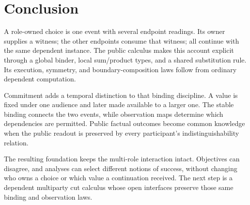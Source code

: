 \section{Conclusion}

A role-owned choice is one event with several endpoint readings. Its owner
supplies a witness; the other endpoints consume that witness; all continue
with the same dependent instance. The public calculus makes this account
explicit through a global binder, local sum/product types, and a shared
substitution rule. Its execution, symmetry, and boundary-composition laws
follow from ordinary dependent computation.

Commitment adds a temporal distinction to that binding discipline. A value is
fixed under one audience and later made available to a larger one. The stable
binding connects the two events, while observation maps determine which
dependencies are permitted. Public factual outcomes become common knowledge
when the public readout is preserved by every participant's
indistinguishability relation.

The resulting foundation keeps the multi-role interaction intact. Objectives
can disagree, and analyses can select different notions of success, without
changing who owns a choice or which value a continuation received. The next
step is a dependent multiparty cut calculus whose open interfaces preserve
those same binding and observation laws.
